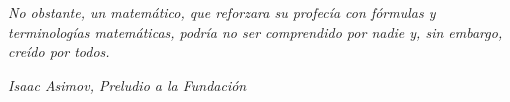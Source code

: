 \newpage
\thispagestyle{empty}

\vspace*{5cm}
\hfill \emph{No obstante, un matemático, que reforzara su profecía con fórmulas y terminologías matemáticas, podría no ser comprendido por nadie y, sin embargo, creído por todos.}

\bigskip
\hfill \emph{Isaac Asimov, Preludio a la Fundación}

\pagebreak